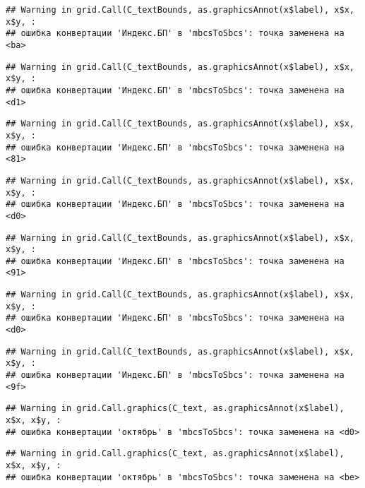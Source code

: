 \documentclass[
]{article}
\begin{document}
\begin{verbatim}
## Warning in grid.Call(C_textBounds, as.graphicsAnnot(x$label), x$x, x$y, :
## ошибка конвертации 'Индекс.БП' в 'mbcsToSbcs': точка заменена на <ba>
\end{verbatim}

\begin{verbatim}
## Warning in grid.Call(C_textBounds, as.graphicsAnnot(x$label), x$x, x$y, :
## ошибка конвертации 'Индекс.БП' в 'mbcsToSbcs': точка заменена на <d1>
\end{verbatim}

\begin{verbatim}
## Warning in grid.Call(C_textBounds, as.graphicsAnnot(x$label), x$x, x$y, :
## ошибка конвертации 'Индекс.БП' в 'mbcsToSbcs': точка заменена на <81>
\end{verbatim}

\begin{verbatim}
## Warning in grid.Call(C_textBounds, as.graphicsAnnot(x$label), x$x, x$y, :
## ошибка конвертации 'Индекс.БП' в 'mbcsToSbcs': точка заменена на <d0>
\end{verbatim}

\begin{verbatim}
## Warning in grid.Call(C_textBounds, as.graphicsAnnot(x$label), x$x, x$y, :
## ошибка конвертации 'Индекс.БП' в 'mbcsToSbcs': точка заменена на <91>
\end{verbatim}

\begin{verbatim}
## Warning in grid.Call(C_textBounds, as.graphicsAnnot(x$label), x$x, x$y, :
## ошибка конвертации 'Индекс.БП' в 'mbcsToSbcs': точка заменена на <d0>
\end{verbatim}

\begin{verbatim}
## Warning in grid.Call(C_textBounds, as.graphicsAnnot(x$label), x$x, x$y, :
## ошибка конвертации 'Индекс.БП' в 'mbcsToSbcs': точка заменена на <9f>
\end{verbatim}

\begin{verbatim}
## Warning in grid.Call.graphics(C_text, as.graphicsAnnot(x$label), x$x, x$y, :
## ошибка конвертации 'октябрь' в 'mbcsToSbcs': точка заменена на <d0>
\end{verbatim}

\begin{verbatim}
## Warning in grid.Call.graphics(C_text, as.graphicsAnnot(x$label), x$x, x$y, :
## ошибка конвертации 'октябрь' в 'mbcsToSbcs': точка заменена на <be>
\end{verbatim}
\end{document}

